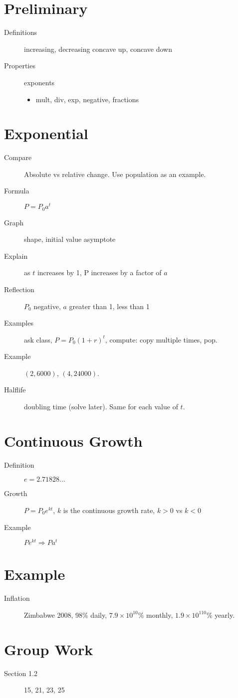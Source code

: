 \documentclass[11pt]{article}
\begin{document}
\drawtitle

\section*{Preliminary}
\begin{description}
\item[Definitions] increasing, decreasing concave up, concave down
\item[Properties] exponents
  \begin{itemize}
  \item mult, div, exp, negative, fractions
  \end{itemize}
\end{description}

\section*{Exponential}
\begin{description}
\item[Compare] Absolute vs relative change. Use population as an
  example.
\item[Formula] $P=P_0a^t$
\item[Graph] shape, initial value asymptote
\item[Explain] as $t$ increases by 1, P increases by a factor of $a$
\item[Reflection] $P_0$ negative, $a$ greater than 1, less than 1
\item[Examples] ask class, $P=P_0(1+r)^t$, compute: copy multiple
  times, pop.
\item[Example] $(2, 6000)$, $(4, 24000)$.
\item[Halflife] doubling time (solve later).  Same for each value of $t$.
\end{description}

\section*{Continuous Growth}
\begin{description}
\item[Definition] $e=2.71828\dots$
\item[Growth] $P=P_0e^{kt}$, $k$ is the continuous growth rate, $k>0$
  vs $k<0$
\item[Example] $Pe^{kt}\Rightarrow Pa^t$
\end{description}

\section*{Example}
\begin{description}
\item[Inflation] Zimbabwe 2008, 98\% daily, $7.9\times 10^{10}$\%
  monthly, $1.9\times 10^{110}$\% yearly.
\end{description}

\section*{Group Work}
\begin{description}
\item[Section 1.2] 15, 21, 23, 25
\end{description}
\end{document}
